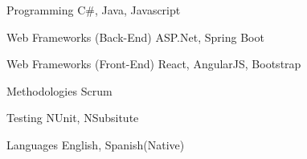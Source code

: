 


\begin{cvskills}


\cvskill
{Programming} %
{C\#, Java, Javascript} %


\cvskill
{Web Frameworks (Back-End)} %
{ASP.Net, Spring Boot} %

\cvskill
{Web Frameworks (Front-End)} %
{React, AngularJS, Bootstrap} %


\cvskill
{Methodologies}
{Scrum}

\cvskill
{Testing}
{NUnit, NSubsitute}

\cvskill
{Languages} %
{English, Spanish(Native)} %

\end{cvskills}